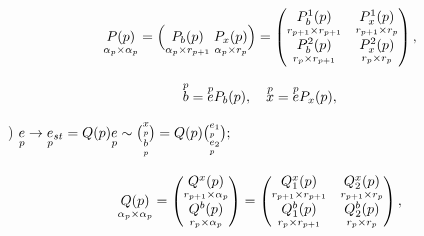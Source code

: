 \begin{equation} 


\down{\alpha_p\times\alpha_p}{P(p)}=\Bigl( 


\down{\alpha_p\times r_{p+1}}{P_b(p)}\; 


\down{\alpha_p\times r_p}{P_x(p)}\Bigr)= 


\begin{pmatrix} 


\down{r_{p+1}\times r_{p+1}}{P^1_b(p)}& 


\down{r_{p+1}\times r_p}{P^1_x(p)}\\ 


\down{r_p\times r_{p+1}}{P^2_b(p)} & 


\down{r_p\times r_p}{P^2_x(p)} 


\end{pmatrix}, 


\end{equation} 


$$ 


\up{p}{b}=\up{p}{e}P_b(p),\quad 


\up{p}{x}=\up{p}{e}P_x(p), 


$$ 


) $ \hfill \down{p}{e}\to\down{p}{e}_{st}=Q(p)\down{p}{e}\sim 


\binom{\down{p}{x}}{\down{p}{b}}=Q(p) 


\binom{\down{p}{e}_1}{\down{p}{e}_2}; \hfill 


$ 


\begin{equation} 


\down{\alpha_p\times\alpha_p}{Q(p)}= 


\begin{pmatrix} 


\down{r_{p+1}\times\alpha_p}{Q^x(p)}\\ 


\down{r_p\times\alpha_p}{Q^b(p)} 


\end{pmatrix} 


= 


\begin{pmatrix} 


\down{r_{p+1}\times r_{p+1}}{Q^x_1(p)}& 


\down{r_{p+1}\times r_p}{Q^x_2(p)}\\ 


\down{r_p\times r_{p+1}}{Q^b_1(p)}& 


\down{r_p\times r_p}{Q^b_2(p)} 


\end{pmatrix}, 


\end{equation} 


